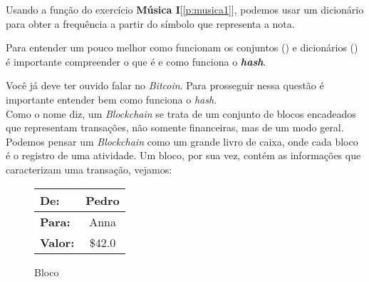 \documentclass[12pt]{article}
\begin{document}
	
	\label{p:musica2}
	
	Usando a função do exercício \textbf{Música I}[\ref{p:musica1}], podemos usar um dicionário para obter a frequência a partir do símbolo que representa a nota.


	\begin{interlude}{ \incomplete}\label{i:hash}
		
	Para entender um pouco melhor como funcionam os conjuntos () e dicionários () é importante compreender o que é e como funciona o \textit{\textbf{hash}}.
	
	
	
	\end{interlude}	
	
	\label{p:blockchain}
	
	Você já deve ter ouvido falar no \textit{Bitcoin}. Para prosseguir nessa questão é importante entender bem como funciona o \textit{hash}.\\
	
	Como o nome diz, um \textit{Blockchain} se trata de um conjunto de blocos encadeados que representam transações, não somente financeiras, mas de um modo geral. Podemos pensar um \textit{Blockchain} como um grande livro de caixa, onde cada bloco é o registro de uma atividade. Um bloco, por sua vez, contém as informações que caracterizam uma transação, vejamos:
	
	\begin{figure}[H]
		\centering
		\begin{tabular}{|lc|}
		\hline
		\textbf{De:} & Pedro \\
		\hline
		\textbf{Para:} & Anna \\
		\hline		
		\textbf{Valor:} & \$42.0  \\
		\hline
		\end{tabular}
		\label{fig:blockchain}
		\caption{Bloco}
	\end{figure}
	
	
	
	
\end{document}
